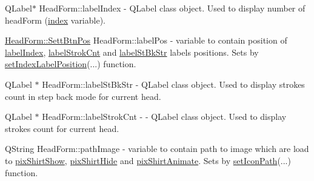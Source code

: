 \mbox{\label{classHeadForm_adbc068754f789e1a63c113f1ce7caf38}} 
{\footnotesize\ttfamily Q\+Label$\ast$ Head\+Form\+::\texorpdfstring{label\+Index}{labelIndex}{\ttfamily [private]}} - Q\+Label class object. Used to display number of head\+Form (\hyperlink{classHeadForm_a5e01a73f3b47bdc85ea85f5650cdf0d0}{index} variable).

\mbox{\label{classHeadForm_a3f9306937e89ae7a306034c875efc48e}} 
{\footnotesize\ttfamily \mbox{\hyperlink{classHeadForm_ae0ae43de172739d43f503ff0a03aad1a}{Head\+Form\+::\+Sett\+Btn\+Pos}} Head\+Form\+::\texorpdfstring{label\+Pos}{labelPos}{\ttfamily [private]}} - variable to contain position of \hyperlink{classHeadForm_adbc068754f789e1a63c113f1ce7caf38}{label\+Index}, \hyperlink{classHeadForm_a591efe6e830fd170cb549bca142d2759}{label\+Strok\+Cnt} and \hyperlink{classHeadForm_a1a7f706cff05b5644d3eae9ab21b2caf}{label\+St\+Bk\+Str} labels positions. Sets by \hyperlink{classHeadForm_af74e0d29b259aa4f2e9529346237207a}{set\+Index\+Label\+Position}(...) function.

\mbox{\label{classHeadForm_a1a7f706cff05b5644d3eae9ab21b2caf}} 
{\footnotesize\ttfamily Q\+Label $\ast$ Head\+Form\+::\texorpdfstring{label\+St\+Bk\+Str}{labelStBkStr}{\ttfamily [private]}} - Q\+Label class object. Used to display strokes count in step back mode for current head. 

\mbox{\label{classHeadForm_a591efe6e830fd170cb549bca142d2759}} 
{\footnotesize\ttfamily Q\+Label $\ast$ Head\+Form\+::\texorpdfstring{label\+Strok\+Cnt}{labelStrokCnt}{\ttfamily [private]}} -  - Q\+Label class object. Used to display strokes count for current head.

\mbox{\label{classHeadForm_a88124373bcbdb5679ea11608362e485b}} 
{\footnotesize\ttfamily Q\+String Head\+Form\+::\texorpdfstring{path\+Image}{pathImage}{\ttfamily [private]}} - variable to contain path to image which are load to \hyperlink{classHeadForm_a30f30561d242211ed827ffaf627e0839}{pix\+Shirt\+Show}, \hyperlink{classHeadForm_a54d7609f912aa7b0edd6850e1f57f0a0}{pix\+Shirt\+Hide} and \hyperlink{classHeadForm_aa44a452750fe6db786814ec502f0d655}{pix\+Shirt\+Animate}. Sets by \hyperlink{classHeadForm_acb2b064f0453aeed4a5bea49cc33be47}{set\+Icon\+Path}(...) function.

